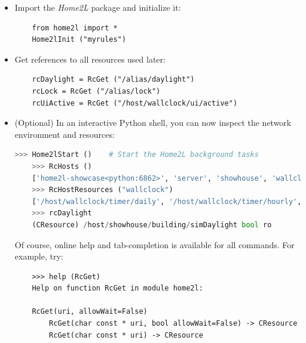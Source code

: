 \documentclass[12pt,english,parskip=half]{scrreprt}
\begin{document}
\begin{itemize}[$\blacktriangleright$]

\item
  Import the \emph{Home2L} package and initialize it:
  \begin{lstlisting}
    from home2l import *
    Home2lInit ("myrules")
  \end{lstlisting}

\item
  Get references to all resources used later:
  \begin{lstlisting}
    rcDaylight = RcGet ("/alias/daylight")
    rcLock = RcGet ("/alias/lock")
    rcUiActive = RcGet ("/host/wallclock/ui/active")
  \end{lstlisting}

\item
  (Optional) In an interactive Python shell, you can now inspect the network
  environment and resources:
  \begin{lstlisting}[language=Python]
    >>> Home2lStart ()    # Start the Home2L background tasks
    >>> RcHosts ()
    ['home2l-showcase<python:6862>', 'server', 'showhouse', 'wallclock']
    >>> RcHostResources ("wallclock")
    ['/host/wallclock/timer/daily', '/host/wallclock/timer/hourly', '/host/wallclock/timer/minutely', '/host/wallclock/timer/now', '/host/wallclock/timer/twilight/dawn06', '/host/wallclock/timer/twilight/dawn12', '/host/wallclock/timer/twilight/dawn18', '/host/wallclock/timer/twilight/day', '/host/wallclock/timer/twilight/day06', '/host/wallclock/timer/twilight/day12', '/host/wallclock/timer/twilight/day18', '/host/wallclock/timer/twilight/dusk06', '/host/wallclock/timer/twilight/dusk12', '/host/wallclock/timer/twilight/dusk18', '/host/wallclock/timer/twilight/sunrise', '/host/wallclock/timer/twilight/sunset', '/host/wallclock/ui/active', '/host/wallclock/ui/bluetooth', '/host/wallclock/ui/bluetoothAudio', '/host/wallclock/ui/dispLight', '/host/wallclock/ui/luxSensor', '/host/wallclock/ui/mute', '/host/wallclock/ui/standby']
    >>> rcDaylight
    (CResource) /host/showhouse/building/simDaylight bool ro
  \end{lstlisting}
  Of course, online help and tab-completion is available for all commands. For example, try:
  \begin{lstlisting}
    >>> help (RcGet)
    Help on function RcGet in module home2l:

    RcGet(uri, allowWait=False)
        RcGet(char const * uri, bool allowWait=False) -> CResource
        RcGet(char const * uri) -> CResource


\end{lstlisting}
\end{itemize}
\end{document}
